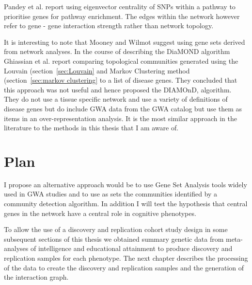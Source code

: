 Pandey et al. report using eigenvector centrality of SNPs within a pathway to prioritise genes for pathway enrichment\cite{pandey2012epistasis}. The edges within the network however refer to gene - gene interaction strength rather than network topology. 

It is interesting to note that Mooney and Wilmot \cite{mooney2015gene} suggest using gene sets derived from network analyses. In the course of describing the DiaMOND algorithm Ghiassian et al.\cite{ghiassian2015disease} report comparing topological communities generated using the Louvain \cite{blondel2008fast} (section~\ref{sec:Louvain} and Markov Clustering method \cite{van2000graph} (section~\ref{sec:markov clustering} to a list of disease genes. They concluded that this approach was not useful and hence proposed the DIAMOnD, algorithm. They do not use a tissue specific network and use a variety of definitions of disease genes but do include GWA data from the GWA catalog \cite{macarthur2017new} but use them as items in an over-representation analysis. It is the most similar approach in the literature to the methods in this thesis that I am aware of.



\section{Plan}
\label{sec:intro plan to procede to next chapter}

I propose an alternative approach would be to use Gene Set Analysis tools widely used in GWA studies and to use as sets the communities identified by a community detection algorithm. In addition I will test the hypothesis that central genes in the network have a central role in cognitive phenotypes. 

To allow the use of a discovery and replication cohort study design in some subsequent sections of this thesis we obtained summary genetic data from meta-analyses  of intelligence and educational attainment to produce discovery and replication samples for each phenotype. The next chapter describes the processing of the data to create the discovery and replication samples and the generation of the interaction graph.








